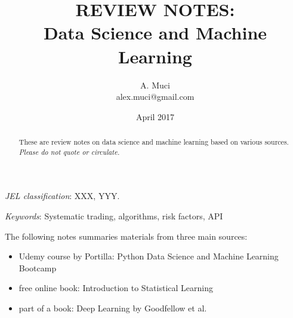 \documentclass[12pt]{article}
\begin{document}


\title{REVIEW NOTES: \\
	Data Science and Machine Learning    
	}


\author{A. Muci \\
        alex.muci@gmail.com}

\date{April 2017}  %


\renewcommand{\thefootnote}{\fnsymbol{footnote}}   

\singlespacing

\maketitle

\vspace{-.2in}
\begin{abstract}
\noindent These are review notes on data science and machine learning based on various sources. \\  
\textit{Please do not quote or circulate.} 
\end{abstract}

\medskip

\noindent \textit{JEL classification}: XXX, YYY.

\medskip
\noindent \textit{Keywords}: Systematic trading, algorithms, risk factors, API %

\clearpage

\tableofcontents

\thispagestyle{empty}

\clearpage

\onehalfspacing
\setcounter{footnote}{0}
\renewcommand{\thefootnote}{\arabic{footnote}}
\setcounter{page}{1}
The following notes summaries materials from three main sources:
\begin{itemize}
	\item Udemy course by Portilla: Python Data Science and Machine Learning Bootcamp
	\item free online book: Introduction to Statistical Learning
	\item part of a book: Deep Learning by Goodfellow et al. 
\end{itemize}
\end{document}
